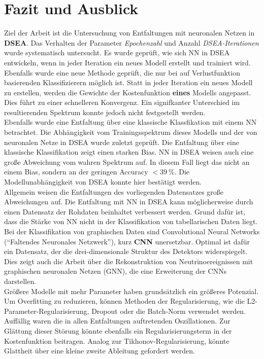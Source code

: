 \chapter{Fazit und Ausblick}

Ziel der Arbeit ist die Untersuchung von Entfaltungen mit neuronalen Netzen in \textbf{DSEA}.
Das Verhalten der Parameter \textit{Epochenzahl} und Anzahl \textit{DSEA-Iterationen} wurde systematisch untersucht.
Es wurde geprüft, wie sich NN in DSEA entwickeln, wenn in jeder Iteration ein neues Modell erstellt und trainiert wird.
Ebenfalls wurde eine neue Methode geprüft, die nur bei auf Verlustfunktion basierenden Klassifizierern möglich ist.
Statt in jeder Iteration ein neues Modell zu erstellen, werden die Gewichte der Kostenfunktion \textbf{eines} Modells angepasst.
Dies führt zu einer schnelleren Konvergenz.
Ein signifkanter Unterschied im resultierenden Spektrum konnte jedoch nicht festgestellt werden.
\\
Ebenfalls wurde eine Entfaltung über eine klassische Klassfikation mit einem NN betrachtet.
Die Abhängigkeit vom Trainingsspektrum dieses Modells und der von neuronalen Netze in DSEA wurde zuletzt geprüft.
Die Entfaltung über eine klassische Klassifikation zeigt einen starken Bias.
NN in DSEA weisen auch eine große Abweichung vom wahren Spektrum auf.
In diesem Fall liegt das nicht an einem Bias, sondern an der geringen Accuracy $< \SI{39}{\percent}$.
Die Modellunabhängigkeit von DSEA konnte hier bestätigt werden.
\\
Allgemein weisen die Entfaltungen des vorliegenden Datensatzes große Abweichungen auf.
Die Entfaltung mit NN in DSEA kann möglicherweise durch einen Datensatz der Rohdaten beinhaltet verbessert werden.
Grund dafür ist, dass die Stärke von NN nicht in der Klassifikation von tabellarischen Daten liegt.
Bei der Klassifikation von graphischen Daten sind Convolutional Neural Networks ("`Faltendes Neuronales Netzwerk"'), kurz \textbf{CNN} unersetzbar.
Optimal ist dafür ein Datensatz, der die drei-dimensionale Struktur des Detektors widerspiegelt.
Dies zeigt auch die Arbeit \cite{reconstruction_nn} über die Rekonstruktion von Neutrinoereignissen mit graphischen neuronalen Netzen (GNN), die eine Erweiterung der CNNs \cite{reconstruction_nn} darstellen.
\\
Größere Modelle mit mehr Parameter haben grundsätzlich ein größeres Potenzial.
Um Overfitting zu reduzieren, können Methoden der Regularisierung, wie die L2-Parameter-Regularisierung, Dropout oder die Batch-Norm verwendet werden.
\\
Auffällig waren die in allen Entfaltungen auftretenden Oszillationen.
Zur Glättung dieser Störung könnte ebenfalls ein Regularisierungsterm in der Kostenfunktion beitragen.
Analog zur Tikhonov-Regularisierung\cite{tikhonov}, könnte Glattheit über eine kleine zweite Ableitung gefordert werden.